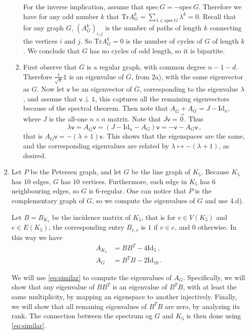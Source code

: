 \documentclass[kulak]{tplt}
\theoremstyle{definition}
\newcommand{\vv}{\mathsf{v}}
\newcommand{\Tr}{\mathrm{Tr}}
\newcommand{\Id}{\mathrm{Id}}
\newcommand{\spec}{\mathrm{spec}}
\begin{document}
\begin{enumerate}
\begin{enumerate}
For the inverse implication, assume that $\spec \, G = - \spec \, G$.
Therefore we have for any odd number $k$ that $\Tr A_G^k = \sum_{\lambda \in \spec \, G } \lambda^k = 0$.
Recall that for any graph $G$, $(A_G^k)_{i, j}$ is the number of paths of length $k$ connecting the vertices $i$ and $j$.
So $\Tr A_G^k = 0$ is the number of cycles of $G$ of length $k$.
We conclude that $G$ has no cycles of odd length, so it is bipartite.


\item 
First observe that $\overline{G}$ is a regular graph, with common degree $n - 1 - d $.
Therefore $\frac{1}{\sqrt{n}} \mathbb{1}$ is an eigenvalue of $\overline{G}$, from 2a), with the same eigenvector as $G$.
Now let $\vv $ be an eigenvector of $\overline{G}$, corresponding to the eigenvalue $\lambda$, and assume that $\vv \perp \mathbb{1}$, this captures all the remaining eigenvectors because of the spectral theorem.
Then note that $A_{\overline{G}} + A_G = J - \Id_n$, where $J$ is the all-one $n\times n$ matrix.
Note that $J\vv = \vec{0}$.
Thus
$$\lambda \vv = A_{\overline{G}}\vv = (J - \Id_n - A_G)\vv = -\vv - A_G \vv\, ,$$
that is $A_G \vv = -(\lambda + 1)\vv$.
This shows that the eigenspaces are the same, and the corresponding eigenvalues are related by $\lambda \mapsto -(\lambda + 1)$, as desired.
\end{enumerate}


\item 
Let $P$ be the Petersen graph, and let $G$ be the line graph of $K_5$.
Because $K_5$ has $10$ edges, $G$ has $10$ vertices.
Furthermore, each edge in $K_5$ has $6$ neighbouring edges, so $G$ is $6$-regular.
One can notice that $P$ is the complementary graph of $G$, so we compute the eigenvalues of $G$ and use 4.d).

Let $B = B_{K_5}$ be the incidence matrix of $K_5$, that is for $v\in V(K_5)$ and $e\in E(K_5)$, the corresponding entry $B_{v, e}$ is $1$ if $v\in e$, and $0$ otherwise.
In this way we have 
\begin{equation}\label{eq:similar}
\begin{split}
A_{K_5} &= B B^T - 4 \Id_{5} \, , \\
A_G &= B^T B - 2 \Id_{10} \, .
\end{split}
\end{equation}

We will use \eqref{eq:similar} to compute the eigenvalues of $A_G$.
Specifically, we will show that any eigenvalue of $B B^T$ is an eigenvalue of $B^T B$, with at least the same multiplicity, by mapping an eigenspace to another injectively.
Finally, we will show that all remaning eigenvalues of $B^T B$ are zero, by analyzing its rank.
The connection between the spectrum og $G$ and $K_5$ is then done using \eqref{eq:similar}.


\end{enumerate}
\end{document}
